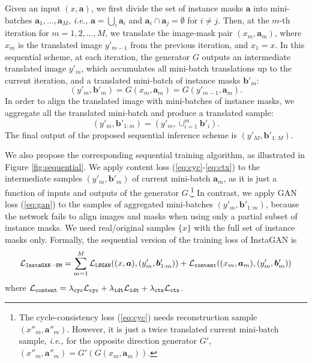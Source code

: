 \documentclass{article} \usepackage{iclr2019_conference,times}
\begin{document}
Given an input $(x, \bm{a})$,
we first divide the set of instance masks $\bm{a}$ into  mini-batches $\bm{a}_1, \dots, \bm{a}_M$, \textit{i.e.,} $\bm a = \bigcup_i \bm a_i$ and $\bm a_i \cap \bm a_j =\emptyset$ for $i\neq j$.
Then, at the $m$-th iteration for $m=1,2,\dots, M$, we translate the image-mask pair $(x_m, \bm{a}_m)$,
where $x_m$ is the translated image $y'_{m-1}$ from the previous iteration, and $x_1 = x$. 
In this sequential scheme, at each iteration, the generator $G$ outputs an intermediate translated image $y'_m$, which accumulates all mini-batch translations up to the current iteration, and a translated mini-batch of instance masks $\bm{b}'_{m}$:
\begin{equation}
(y'_m, \bm{b}'_{m}) = G(x_m, \bm{a}_m) = G(y'_{m-1}, \bm{a}_m). 
\label{eq:local}
\end{equation}
In order to align the translated  image with mini-batches of instance masks, we aggregate all the translated mini-batch and produce a translated sample:
\begin{equation}
	(y'_m, \bm{b}'_{1:m})
	= (y'_m, \cup_{i=1}^m \bm{b}'_i).
	\label{eq:global}
\end{equation}
The final output of the proposed sequential inference scheme is $(y'_M, \bm{b}'_{1:M})$.




We also propose the corresponding sequential training algorithm, as illustrated in Figure \ref{fig:sequential}.
We apply content loss (\ref{eq:cyc}-\ref{eq:ctx}) to the intermediate samples $(y'_m, \bm{b}'_m)$ of current mini-batch $\bm{a}_m$,
as it is just a function of inputs and outputs of the generator $G$.\footnote{
The cycle-consistency loss (\ref{eq:cyc}) needs reconstruction sample $(x''_m, \bm{a}''_m)$.
However, it is just a twice translated current mini-batch sample,
\textit{i.e.,} for the opposite direction generator $G'$, $(x''_m, \bm{a}''_m) = G'(G(x_m, \bm{a}_m))$.}
In contrast, we apply GAN loss (\ref{eq:gan}) to the samples of aggregated mini-batches $(y'_m, \bm{b}'_{1:m})$,
because the network fails to align images and masks when using only a partial subset of instance masks.
We used real/original samples $\{x\}$ with the full set of instance masks only.
Formally, the sequential version of the training loss of InstaGAN is
\begin{equation}
	\mathcal{L}_{\tt InstaGAN-SM} = \sum_{m=1}^M
	\mathcal{L}_{\tt LSGAN}((x, \bm{a}), (y'_m, \bm{b}'_{1:m})) + 
	\mathcal{L}_{\tt content}((x_m, \bm{a}_m), (y'_m, \bm{b}'_m))
	\label{eq:loss-sequential}
\end{equation}
where $\mathcal{L}_{\tt content} = \lambda_{\tt cyc} \mathcal{L}_{\tt cyc}
+ \lambda_{\tt idt} \mathcal{L}_{\tt idt} + \lambda_{\tt ctx} \mathcal{L}_{\tt ctx}$.
\end{document}
